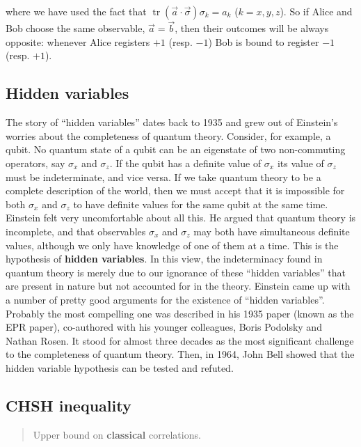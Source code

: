 \documentclass[fleqn]{article}
\begin{document}
where we have used the fact that \(\operatorname{tr}(\vec{a}\cdot\vec\sigma)\sigma_k = a_k\) (\(k=x,y,z\)).
So if Alice and Bob choose the same observable, \(\vec{a} = \vec{b}\), then their outcomes will be always opposite: whenever Alice registers \(+1\) (resp. \(-1\)) Bob is bound to register \(-1\) (resp. \(+1\)).

\hypertarget{hidden-variables}{%
\subsection{Hidden variables}\label{hidden-variables}}

The story of ``hidden variables'' dates back to 1935 and grew out of Einstein's worries about the completeness of quantum theory.
Consider, for example, a qubit.
No quantum state of a qubit can be an eigenstate of two non-commuting operators, say \(\sigma_x\) and \(\sigma_z\).
If the qubit has a definite value of \(\sigma_x\) its value of \(\sigma_z\) must be indeterminate, and vice versa.
If we take quantum theory to be a complete description of the world, then we must accept that it is impossible for both \(\sigma_x\) and \(\sigma_z\) to have definite values for the same qubit at the same time.
Einstein felt very uncomfortable about all this.
He argued that quantum theory is incomplete, and that observables \(\sigma_x\) and \(\sigma_z\) may both have simultaneous definite values, although we only have knowledge of one of them at a time.
This is the hypothesis of \textbf{hidden variables}.
In this view, the indeterminacy found in quantum theory is merely due to our ignorance of these ``hidden variables'' that are present in nature but not accounted for in the theory.
Einstein came up with a number of pretty good arguments for the existence of ``hidden variables''.
Probably the most compelling one was described in his 1935 paper (known as the EPR paper), co-authored with his younger colleagues, Boris Podolsky and Nathan Rosen.
It stood for almost three decades as the most significant challenge to the completeness of quantum theory.
Then, in 1964, John Bell showed that the hidden variable hypothesis can be tested and refuted.

\hypertarget{chsh-inequality}{%
\subsection{CHSH inequality}\label{chsh-inequality}}

\begin{quote}
Upper bound on \textbf{classical} correlations.
\end{quote}
\end{document}
